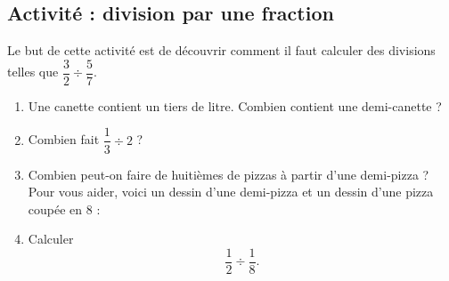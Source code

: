 
\subsection*{Activité : division par une fraction}

Le but de cette activité est de découvrir comment il faut calculer des divisions telles que \( \dfrac{ 3 }{ 2 }\div\dfrac{ 5 }{ 7 }\).
\begin{enumerate}
    \item
        Une canette contient un tiers de litre. Combien contient une demi-canette ?
    \item
        Combien fait \( \dfrac{ 1 }{ 3 }\div 2\) ?
    \item
        Combien peut-on faire de huitièmes de pizzas à partir d'une demi-pizza ? Pour vous aider, voici un dessin d'une demi-pizza et un dessin d'une pizza coupée en \( 8\) :
        \begin{center}
           
           
        \end{center}
    \item
        Calculer
        \begin{equation}
            \dfrac{ 1 }{ 2 }\div\frac{1}{ 8 }.
        \end{equation}

\end{enumerate}
